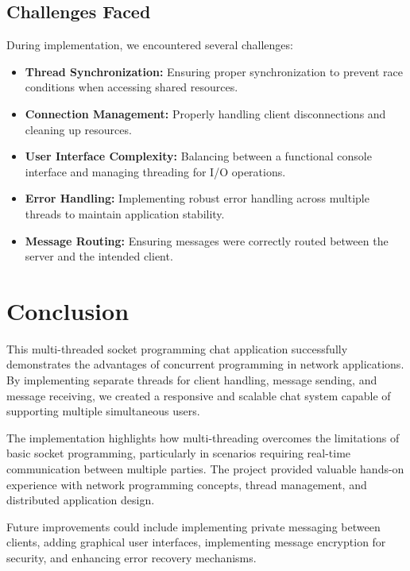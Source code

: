 \documentclass[12pt,a4paper]{article}
\begin{document}
\subsection{Challenges Faced}
During implementation, we encountered several challenges:
\begin{itemize}
    \item \textbf{Thread Synchronization:} Ensuring proper synchronization to prevent race conditions when accessing shared resources.
    
    \item \textbf{Connection Management:} Properly handling client disconnections and cleaning up resources.
    
    \item \textbf{User Interface Complexity:} Balancing between a functional console interface and managing threading for I/O operations.
    
    \item \textbf{Error Handling:} Implementing robust error handling across multiple threads to maintain application stability.
    
    \item \textbf{Message Routing:} Ensuring messages were correctly routed between the server and the intended client.
\end{itemize}

\section{Conclusion}
This multi-threaded socket programming chat application successfully demonstrates the advantages of concurrent programming in network applications. By implementing separate threads for client handling, message sending, and message receiving, we created a responsive and scalable chat system capable of supporting multiple simultaneous users.

The implementation highlights how multi-threading overcomes the limitations of basic socket programming, particularly in scenarios requiring real-time communication between multiple parties. The project provided valuable hands-on experience with network programming concepts, thread management, and distributed application design.

Future improvements could include implementing private messaging between clients, adding graphical user interfaces, implementing message encryption for security, and enhancing error recovery mechanisms.
\end{document}
